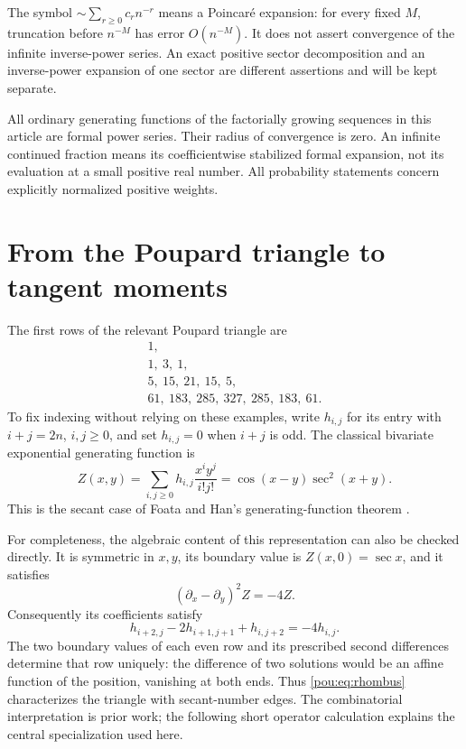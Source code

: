 \documentclass[11pt]{article}
\theoremstyle{definition}
\theoremstyle{remark}
\begin{document}
The symbol $\sim\sum_{r\ge0}c_r n^{-r}$ means a Poincar\'e expansion:
for every fixed $M$, truncation before $n^{-M}$ has error $O(n^{-M})$.
It does not assert convergence of the infinite inverse-power series.
An exact positive sector decomposition and an inverse-power expansion of
one sector are different assertions and will be kept separate.

All ordinary generating functions of the factorially growing sequences in
this article are formal power series.  Their radius of convergence is zero.
An infinite continued fraction means its coefficientwise stabilized formal
expansion, not its evaluation at a small positive real number.  All
probability statements concern explicitly normalized positive weights.

\section{From the Poupard triangle to tangent moments}\label{pou:sec:poupard}

The first rows of the relevant Poupard triangle are
\[
\begin{array}{c}
1,\\
1,\ 3,\ 1,\\
5,\ 15,\ 21,\ 15,\ 5,\\
61,\ 183,\ 285,\ 327,\ 285,\ 183,\ 61.
\end{array}
\]
To fix indexing without relying on these examples, write $h_{i,j}$ for its
entry with $i+j=2n$, $i,j\ge0$, and set $h_{i,j}=0$ when $i+j$ is odd.
The classical bivariate exponential generating function is
\begin{equation}\label{pou:eq:rhombus}
 Z(x,y)=\sum_{i,j\ge0}h_{i,j}\frac{x^iy^j}{i!j!}
       =\cos(x-y)\sec^2(x+y).
\end{equation}
This is the secant case of Foata and Han's generating-function theorem
\cite[Theorem 1.2]{foatahan}.

For completeness, the algebraic content of this representation can also be
checked directly.  It is symmetric in $x,y$, its boundary value is
$Z(x,0)=\sec x$, and it satisfies
\begin{equation}\label{pou:eq:pde}
 (\partial_x-\partial_y)^2Z=-4Z.
\end{equation}
Consequently its coefficients satisfy
\[
 h_{i+2,j}-2h_{i+1,j+1}+h_{i,j+2}=-4h_{i,j}.
\]
The two boundary values of each even row and its prescribed second
differences determine that row uniquely: the difference of two solutions
would be an affine function of the position, vanishing at both ends.
Thus \eqref{pou:eq:rhombus} characterizes the triangle with secant-number edges.
The combinatorial interpretation is prior work; the following short
operator calculation explains the central specialization used here.
\end{document}
